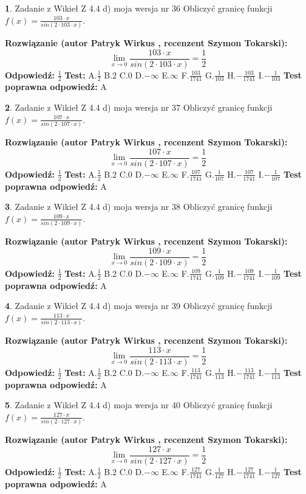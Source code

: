 \documentclass[12pt, a4paper]{article}
\theoremstyle{definition} %
\newtheorem{zad}{}
\newcommand{\zadStart}[1]{\begin{zad}#1\newline}
\newcommand{\zadStop}{\end{zad}}
\newcommand{\rozwStart}[2]{\noindent \textbf{Rozwiązanie (autor #1 , recenzent #2): }\newline}
\newcommand{\rozwStop}{\newline}
\newcommand{\odpStart}{\noindent \textbf{Odpowiedź:}\newline}
\newcommand{\odpStop}{\newline}
\newcommand{\testStart}{\noindent \textbf{Test:}\newline}
\newcommand{\testStop}{\newline}
\newcommand{\kluczStart}{\noindent \textbf{Test poprawna odpowiedź:}\newline}
\newcommand{\kluczStop}{\newline}
\begin{document}
\zadStart{Zadanie z Wikieł Z 4.4 d) moja wersja nr 36}
Obliczyć granicę funkcji $f(x)=\frac{103\cdot x}{sin(2 \cdot103\cdot x)}$.
\zadStop
\rozwStart{Patryk Wirkus}{Szymon Tokarski}
$$\lim\limits_{x\to 0}\frac{103\cdot x}{sin(2 \cdot103\cdot x)}=\frac{1}{2}$$
\rozwStop
\odpStart
$\frac{1}{2}$
\odpStop
\testStart
A.$\frac{1}{2}$
B.$2$
C.$0$
D.$-\infty$
E.$\infty$
F.$\frac{103}{1741}$
G.$\frac{1}{103}$
H.$-\frac{103}{1741}$
I.$-\frac{1}{103}$
\testStop
\kluczStart
A
\kluczStop



\zadStart{Zadanie z Wikieł Z 4.4 d) moja wersja nr 37}
Obliczyć granicę funkcji $f(x)=\frac{107\cdot x}{sin(2 \cdot107\cdot x)}$.
\zadStop
\rozwStart{Patryk Wirkus}{Szymon Tokarski}
$$\lim\limits_{x\to 0}\frac{107\cdot x}{sin(2 \cdot107\cdot x)}=\frac{1}{2}$$
\rozwStop
\odpStart
$\frac{1}{2}$
\odpStop
\testStart
A.$\frac{1}{2}$
B.$2$
C.$0$
D.$-\infty$
E.$\infty$
F.$\frac{107}{1741}$
G.$\frac{1}{107}$
H.$-\frac{107}{1741}$
I.$-\frac{1}{107}$
\testStop
\kluczStart
A
\kluczStop



\zadStart{Zadanie z Wikieł Z 4.4 d) moja wersja nr 38}
Obliczyć granicę funkcji $f(x)=\frac{109\cdot x}{sin(2 \cdot109\cdot x)}$.
\zadStop
\rozwStart{Patryk Wirkus}{Szymon Tokarski}
$$\lim\limits_{x\to 0}\frac{109\cdot x}{sin(2 \cdot109\cdot x)}=\frac{1}{2}$$
\rozwStop
\odpStart
$\frac{1}{2}$
\odpStop
\testStart
A.$\frac{1}{2}$
B.$2$
C.$0$
D.$-\infty$
E.$\infty$
F.$\frac{109}{1741}$
G.$\frac{1}{109}$
H.$-\frac{109}{1741}$
I.$-\frac{1}{109}$
\testStop
\kluczStart
A
\kluczStop



\zadStart{Zadanie z Wikieł Z 4.4 d) moja wersja nr 39}
Obliczyć granicę funkcji $f(x)=\frac{113\cdot x}{sin(2 \cdot113\cdot x)}$.
\zadStop
\rozwStart{Patryk Wirkus}{Szymon Tokarski}
$$\lim\limits_{x\to 0}\frac{113\cdot x}{sin(2 \cdot113\cdot x)}=\frac{1}{2}$$
\rozwStop
\odpStart
$\frac{1}{2}$
\odpStop
\testStart
A.$\frac{1}{2}$
B.$2$
C.$0$
D.$-\infty$
E.$\infty$
F.$\frac{113}{1741}$
G.$\frac{1}{113}$
H.$-\frac{113}{1741}$
I.$-\frac{1}{113}$
\testStop
\kluczStart
A
\kluczStop



\zadStart{Zadanie z Wikieł Z 4.4 d) moja wersja nr 40}
Obliczyć granicę funkcji $f(x)=\frac{127\cdot x}{sin(2 \cdot127\cdot x)}$.
\zadStop
\rozwStart{Patryk Wirkus}{Szymon Tokarski}
$$\lim\limits_{x\to 0}\frac{127\cdot x}{sin(2 \cdot127\cdot x)}=\frac{1}{2}$$
\rozwStop
\odpStart
$\frac{1}{2}$
\odpStop
\testStart
A.$\frac{1}{2}$
B.$2$
C.$0$
D.$-\infty$
E.$\infty$
F.$\frac{127}{1741}$
G.$\frac{1}{127}$
H.$-\frac{127}{1741}$
I.$-\frac{1}{127}$
\testStop
\kluczStart
A
\kluczStop
\end{document}
